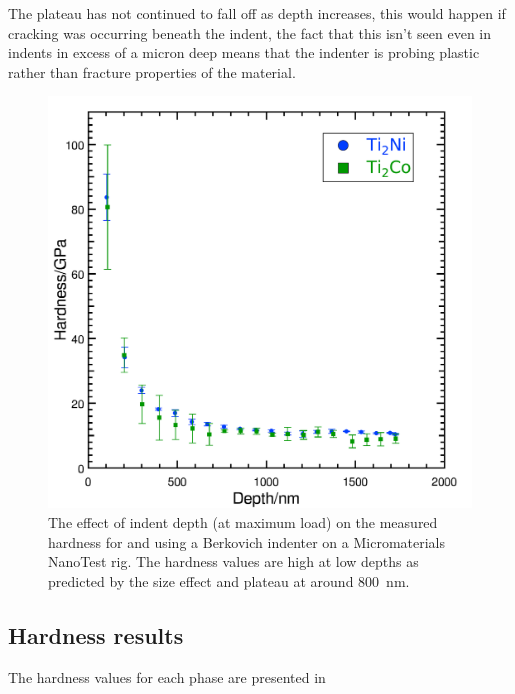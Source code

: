 The plateau has not continued to fall off as depth increases, this would happen if cracking was occurring beneath the indent, the fact that this isn't seen even in indents in excess of a micron deep means that the indenter is probing plastic rather than fracture properties of the material.

\begin{figure}
\centering
\includegraphics[width=\textwidth]{Depth_vs_Hardness_Ti2Ni}
\caption{The effect of indent depth (at maximum load) on the measured hardness for  and  using a Berkovich indenter on a Micromaterials NanoTest rig. The hardness values are high at low depths as predicted by the size effect \cite{Cripps2011} and plateau at around \SI{800}{\nano\meter}.\label{fig:Depth_vs_hardness_Ti2Ni}}
\end{figure}



\subsection{Hardness results}



The hardness values for each phase are presented in 


